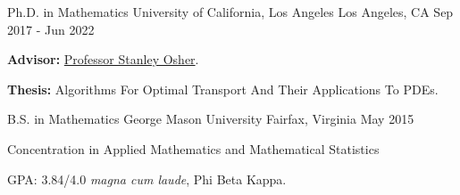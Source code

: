 

\begin{cventries}

  \cventry
    {Ph.D. in Mathematics} %
    {University of California, Los Angeles} %
    {Los Angeles, CA} %
    {Sep 2017 - Jun 2022} %
    {
      \begin{cvitems} %
        \item {\textbf{Advisor:} \href{https://www.math.ucla.edu/~sjo/}{Professor Stanley Osher}.}
        \item {\textbf{Thesis:} Algorithms For Optimal Transport And Their Applications To PDEs.}
      \end{cvitems}
    }
    
  \cventry
    {B.S. in Mathematics} %
    {George Mason University} %
    {Fairfax, Virginia} %
    {May 2015} %
    {\begin{cvitems} %
      \item Concentration in Applied Mathematics and Mathematical Statistics
      \item GPA: 3.84/4.0 \textit{magna cum laude}, Phi Beta Kappa.
    \end{cvitems}
    }
    
\end{cventries}
